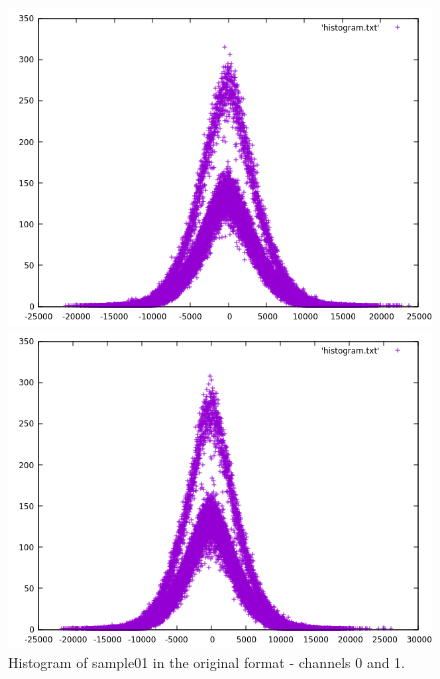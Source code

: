 \documentclass[12pt]{article}
\begin{document}
\begin{figure}[H]
  \centering
  \begin{minipage}{.5\textwidth}
    \centering
    \includegraphics[width=\linewidth]{sample01_stereo_0.png}
  \end{minipage}%
  \begin{minipage}{.5\textwidth}
    \centering
    \includegraphics[width=\linewidth]{sample01_stereo_1.png}
  \end{minipage}
  \caption{Histogram of sample01 in the original format - channels 0 and 1.}
  \label{fig:histogram_stereo}
  

\end{figure}
\end{document}
